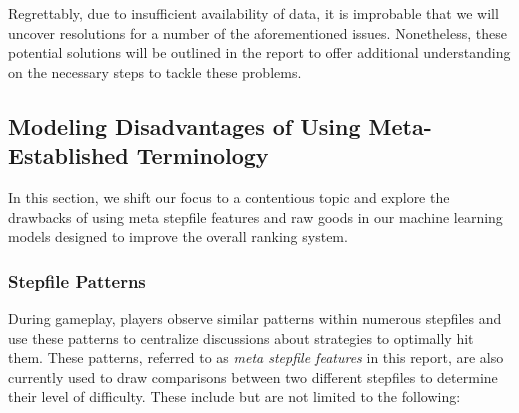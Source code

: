 Regrettably, due to insufficient availability of data, it is improbable that we will uncover resolutions for a number of the aforementioned issues. Nonetheless, these potential solutions will be outlined in the report to offer additional understanding on the necessary steps to tackle these problems.
\subsection{Modeling Disadvantages of Using Meta-Established Terminology}

In this section, we shift our focus to a contentious topic and explore the drawbacks of using meta stepfile features and raw goods in our machine learning models designed to improve the overall ranking system.

\subsubsection{Stepfile Patterns}

During gameplay, players observe similar patterns within numerous stepfiles and use these patterns to centralize discussions about strategies to optimally hit them. These patterns, referred to as \textit{meta stepfile features} in this report, are also currently used to draw comparisons between two different stepfiles to determine their level of difficulty. These include but are not limited to the following:

